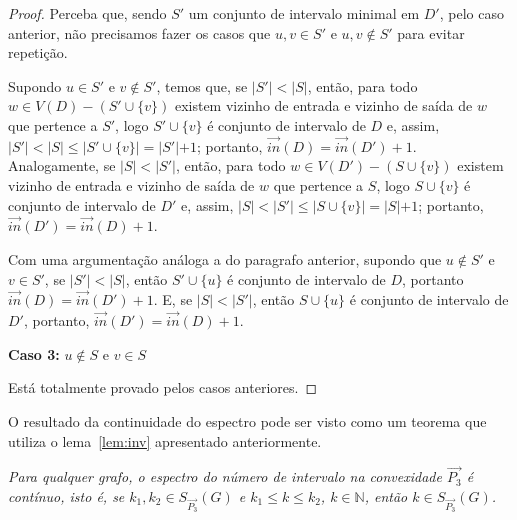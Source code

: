 \begin{proof}
    Perceba que, sendo $S'$ um conjunto de intervalo minimal em $D'$, pelo caso anterior, não precisamos fazer os casos que $u,v\in S'$ e $u,v\notin S'$ para evitar repetição.

    Supondo $u\in S'$ e $v\notin S'$, temos que, se $\lvert S'\lvert < \lvert S\lvert$, então, para todo $w\in V(D)-(S'\cup\{ v \})$ existem vizinho de entrada e vizinho de saída de $w$ que pertence a $S'$, logo $S'\cup \{v\}$ é conjunto de intervalo de $D$ e, assim, $\lvert S' \lvert<\lvert S\lvert \leq \lvert S' \cup \{ v \} \lvert = \lvert S'\lvert +1$; portanto, $\overrightarrow{in}(D)=\overrightarrow{in}(D') +1$. Analogamente, se $\lvert S\lvert < \lvert S'\lvert$, então, para todo $w\in V(D')-(S\cup\{ v \})$ existem vizinho de entrada e vizinho de saída de $w$ que pertence a $S$, logo $S\cup \{v\}$ é conjunto de intervalo de $D'$ e, assim, $\lvert S \lvert<\lvert S'\lvert \leq \lvert S \cup \{ v \} \lvert = \lvert S\lvert +1$; portanto, $\overrightarrow{in}(D')=\overrightarrow{in}(D) +1$.

    Com uma argumentação análoga a do paragrafo anterior, supondo que $u\notin S'$ e $v\in S'$, se $\lvert S'\lvert < \lvert S\lvert$, então $S'\cup \{ u \}$ é conjunto de intervalo de $D$, portanto $\overrightarrow{in}(D)=\overrightarrow{in}(D') +1$. E, se $\lvert S\lvert < \lvert S'\lvert$, então $S\cup \{u\}$ é conjunto de intervalo de $D'$, portanto, $\overrightarrow{in}(D')=\overrightarrow{in}(D) +1$.
    
    \noindent \textbf{Caso 3:} $u \notin S$ e $v \in S$

    Está totalmente provado pelos casos anteriores.
\end{proof}

O resultado da continuidade do espectro pode ser visto como um teorema que utiliza o lema~\ref{lem:inv} apresentado anteriormente.

\begin{theorem}
    \textit{Para qualquer grafo, o espectro do número de intervalo na convexidade $\overrightarrow{P_3}$ é contínuo, isto é, se $k_1,k_2\in S_{\overrightarrow{P_3}}(G)$ e $k_1\leq k\leq k_2$, $k\in \mathbb{N}$, então $k\in S_{\overrightarrow{P_3}}(G)$.}\label{teo:inv}
\end{theorem}

